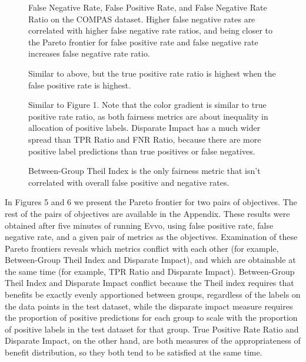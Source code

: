 \documentclass[twoside]{article}
\begin{document}
\newcommand{\fig}[2]{
	\begin{figure}[t]{
		\centering{
			\texttt{[image: \#1]}
		}
		\caption{#2}
	}
	\end{figure}
}

\newcommand{\figures}[4]{
	\begin{figure}[H]{
		\centering{
			\texttt{[image: \#1]}
		}
		\caption{#2}
		}
	\end{figure}
	\begin{figure}[H] {
		\centering{
			\texttt{[image: \#3]}
		}
		\caption{#4}
	}
	\end{figure}
}

\figures{FNR Ratio|COMPAS.png}{False Negative Rate, False Positive Rate, and False Negative Rate Ratio on the COMPAS dataset. Higher false negative rates are correlated with higher false negative rate ratios, and being closer to the Pareto frontier for false positive rate and false negative rate increases false negative rate ratio.}{TPR Ratio|COMPAS.png}{Similar to above, but the true positive rate ratio is highest when the false positive rate is highest.}

\figures{Disparate Impact|COMPAS.png}{Similar to Figure 1. Note that the color gradient is similar to true positive rate ratio, as both fairness metrics are about inequality in allocation of positive labels. Disparate Impact has a much wider spread than TPR Ratio and FNR Ratio, because there are more positive label predictions than true positives or false negatives.}{Between-Group Theil Index|COMPAS.png}{Between-Group Theil Index is the only fairness metric that isn't correlated with overall false positive and negative rates.}

In Figures 5 and 6 we present the Pareto frontier for two pairs of objectives. The rest of the pairs of objectives are available in the Appendix. These results were obtained after five minutes of running Evvo, using false positive rate, false negative rate, and a given pair of metrics as the objectives. Examination of these Pareto frontiers reveals which metrics conflict with each other (for example, Between-Group Theil Index and Disparate Impact), and which are obtainable at the same time (for example, TPR Ratio and Disparate Impact). Between-Group Theil Index and Disparate Impact conflict because the Theil index requires that benefits be exactly evenly apportioned between groups, regardless of the labels on the data points in the test dataset, while the disparate impact measure requires the proportion of positive predictions for each group to scale with the proportion of positive labels in the test dataset for that group. True Positive Rate Ratio and Disparate Impact, on the other hand, are both measures of the appropriateness of benefit distribution, so they both tend to be satisfied at the same time. 
\end{document}
